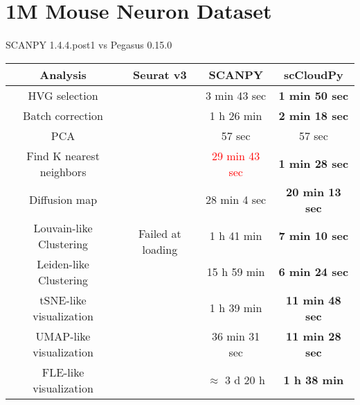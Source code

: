 \documentclass[10pt]{article}
\begin{document}
\section{1M Mouse Neuron Dataset}

\paragraph{}
SCANPY 1.4.4.post1 \qquad vs \qquad Pegasus 0.15.0

\begin{table}[H]
	\centering
	\begin{tabular}{|c|c|c|c|}
		\hline
		Analysis  & Seurat v3 & SCANPY & scCloudPy\\
		\hline \hline
		HVG selection  & \multirow{10}{*}{Failed at loading} & 3 min 43 sec  & \textbf{1 min 50 sec}  \\
		\cline{1-1}\cline{3-4}
		Batch correction  & & 1 h 26 min  & \textbf{2 min 18 sec}  \\
		\cline{1-1}\cline{3-4}
		PCA   & & 57 sec  & 57 sec  \\
		\cline{1-1}\cline{3-4}
		Find K nearest neighbors &  & \textcolor{red}{29 min 43 sec}  & \textbf{1 min 28 sec}  \\
		\cline{1-1}\cline{3-4}
		Diffusion map   & & 28 min 4 sec  & \textbf{20 min 13 sec}  \\
		\cline{1-1}\cline{3-4}
		Louvain-like Clustering &  & 1 h 41 min  & \textbf{7 min 10 sec}  \\
		\cline{1-1}\cline{3-4}
		Leiden-like Clustering & & 15 h 59 min  & \textbf{6 min 24 sec}  \\
		\cline{1-1}\cline{3-4}
		tSNE-like visualization  & & 1 h 39 min  & \textbf{11 min 48 sec}  \\
		\cline{1-1}\cline{3-4}
		UMAP-like visualization  & & 36 min 31 sec   & \textbf{11 min 28 sec}  \\
		\cline{1-1}\cline{3-4}
		FLE-like visualization   & & $\approx$ 3 d 20 h  & \textbf{1 h 38 min}  \\
		\hline
	\end{tabular}
\end{table}
\end{document}
